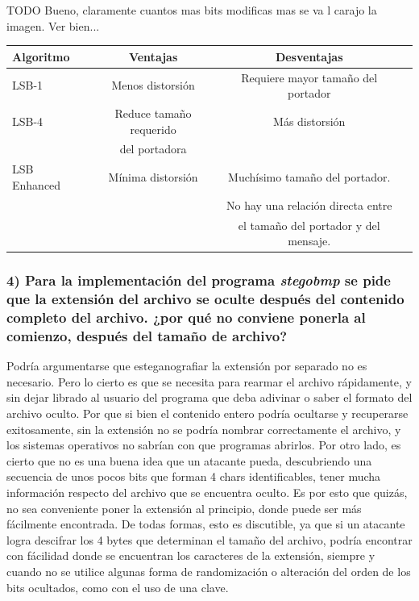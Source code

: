\documentclass[a4paper,10pt]{article}
\begin{document}
TODO
Bueno, claramente cuantos mas bits modificas mas se va l carajo la imagen. Ver bien...

\begin{tabular}[\baselineskip]{|l|c|c|c}
    \hline
    Algoritmo & Ventajas & Desventajas \\
    \hline
    LSB-1 &  Menos distorsión & Requiere mayor tamaño del portador \\
    \hline
    LSB-4       & Reduce tamaño requerido       & Más distorsión \\
                &  del portadora                & \\
    \hline
    LSB Enhanced & Mínima distorsión    & Muchísimo tamaño del portador.\\
                 &                      & No hay una relación directa entre \\
                 &                      & el tamaño del portador y del mensaje.\\
    \hline
\end{tabular} 


\subsubsection*{ 4) Para la implementación del programa \textit{stegobmp} se pide que la extensión del archivo se oculte
después del contenido completo del archivo. ¿por qué no conviene ponerla al comienzo, después del tamaño de archivo?}

Podría argumentarse que esteganografiar la extensión por separado no es necesario. Pero lo cierto es que se necesita para rearmar el archivo rápidamente, y sin dejar librado
al usuario del programa que deba adivinar o saber el formato del archivo oculto. Por que si bien el contenido entero podría ocultarse y recuperarse exitosamente, sin la extensión
no se podría nombrar correctamente el archivo, y los sistemas operativos no sabrían con que programas abrirlos. Por otro lado, es cierto que no es una buena idea que 
un atacante pueda, descubriendo una secuencia de unos pocos bits que forman 4 chars identificables, tener mucha información respecto del archivo que se encuentra oculto.
Es por esto que quizás, no sea conveniente poner la extensión al principio, donde puede ser más fácilmente encontrada. De todas formas, esto es discutible, ya que si un atacante logra
descifrar los 4 bytes que determinan el tamaño del archivo, podría encontrar con fácilidad donde se encuentran los caracteres de la extensión, siempre y cuando no se utilice algunas
forma de randomización o alteración del orden de los bits ocultados, como con el uso de una clave.\\
\end{document}
